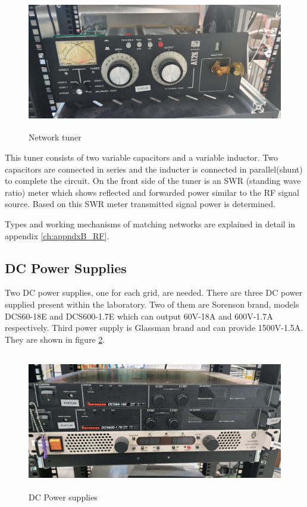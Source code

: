 \begin{figure}[ht] 
    \centering
    \includegraphics[height=6cm]{fig/tuner.jpg}
    \caption{Network tuner}
    \label{fig:tuner}
\end{figure}

This tuner consists of two variable capacitors and a variable inductor. Two capacitors are connected in series and the inducter is connected in parallel(shunt) to complete the circuit. On the front side of the tuner is an SWR (standing wave ratio) meter which shows reflected and forwarded power similar to the RF signal source. Based on this SWR meter transmitted signal power is determined. 

Types and working mechanisms of matching networks are explained in detail in appendix \ref{ch:appndxB_RF}.
\subsection{DC Power Supplies}
Two DC power supplies, one for each grid, are needed. There are three DC power supplied present within the laboratory. Two of them are Sorenson brand, models DCS60-18E and DCS600-1.7E which can output 60V-18A and 600V-1.7A respectively. Third power supply is Glassman brand and can provide 1500V-1.5A. They are shown in figure \ref{fig:dcpowersups}.

\begin{figure}[ht] 
    \centering
    \includegraphics[height=6cm]{fig/dcpowersups.jpeg}
    \caption{DC Power supplies}
    \label{fig:dcpowersups}
\end{figure}


